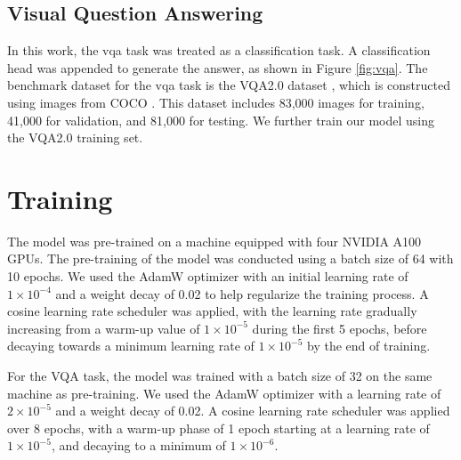 \subsection{Visual Question Answering}
In this work, the \acrfull{vqa} task was treated as a classification task.
A classification head was appended to generate the answer, as shown in Figure \ref{fig:vqa}.
The benchmark dataset for the \acrshort{vqa} task is the VQA2.0 dataset \cite{vqa2}, which is constructed using images from COCO \cite{mscoco}.  
This dataset includes 83,000 images for training, 41,000 for validation, and 81,000 for testing.  
We further train our model using the VQA2.0 training set.

\section{Training}
The model was pre-trained on a machine equipped with four NVIDIA A100 GPUs.
The pre-training of the model was conducted using a batch size of 64 with 10 epochs.
We used the AdamW optimizer with an initial learning rate of \(1 \times 10^{-4}\) and a weight decay of 0.02 to help regularize the training process.
A cosine learning rate scheduler was applied, with the learning rate gradually increasing from a warm-up value of \(1 \times 10^{-5}\) during the first 5 epochs, before decaying towards a minimum learning rate of \(1 \times 10^{-5}\) by the end of training.

For the VQA task, the model was trained with a batch size of 32 on the same machine as pre-training.
We used the AdamW optimizer with a learning rate of \(2 \times 10^{-5}\) and a weight decay of 0.02.
A cosine learning rate scheduler was applied over 8 epochs, with a warm-up phase of 1 epoch starting at a learning rate of \(1 \times 10^{-5}\), and decaying to a minimum of \(1 \times 10^{-6}\).